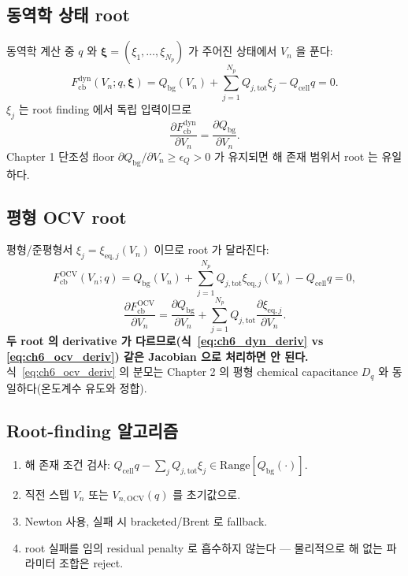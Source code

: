 \documentclass[11pt,a4paper]{article}
\newcommand{\eq}{\mathrm{eq}}
\newcommand{\tot}{\mathrm{tot}}
\newcommand{\bg}{\mathrm{bg}}
\newcommand{\cell}{\mathrm{cell}}
\newcommand{\OCV}{\mathrm{OCV}}
\newcommand{\cb}{\mathrm{cb}}
\newcommand{\dyn}{\mathrm{dyn}}
\begin{document}
\subsection{동역학 상태 root}
동역학 계산 중 $q$ 와 $\bm\xi=(\xi_1,\dots,\xi_{N_p})$ 가 주어진 상태에서 $V_n$ 을 푼다:
\begin{equation}
F_{\cb}^{\dyn}(V_n;q,\bm\xi)=Q_\bg(V_n)+\sum_{j=1}^{N_p}Q_{j,\tot}\xi_j-Q_\cell q=0.
\label{eq:ch6_dyn_root}
\end{equation}
$\xi_j$ 는 root finding 에서 독립 입력이므로
\begin{equation}
\frac{\partial F_{\cb}^{\dyn}}{\partial V_n}=\frac{\partial Q_\bg}{\partial V_n}.
\label{eq:ch6_dyn_deriv}
\end{equation}
Chapter 1 단조성 floor $\partial Q_\bg/\partial V_n\ge\epsilon_Q>0$ 가 유지되면 해 존재 범위서 root 는 유일하다.

\subsection{평형 OCV root}
평형/준평형서 $\xi_j=\xi_{\eq,j}(V_n)$ 이므로 root 가 달라진다:
\begin{equation}
F_{\cb}^{\OCV}(V_n;q)=Q_\bg(V_n)+\sum_{j=1}^{N_p}Q_{j,\tot}\xi_{\eq,j}(V_n)-Q_\cell q=0,
\label{eq:ch6_ocv_root}
\end{equation}
\begin{equation}
\frac{\partial F_{\cb}^{\OCV}}{\partial V_n}=\frac{\partial Q_\bg}{\partial V_n}+\sum_{j=1}^{N_p}Q_{j,\tot}\frac{\partial\xi_{\eq,j}}{\partial V_n}.
\label{eq:ch6_ocv_deriv}
\end{equation}
\textbf{두 root 의 derivative 가 다르므로(식~\eqref{eq:ch6_dyn_deriv} vs \eqref{eq:ch6_ocv_deriv}) 같은
Jacobian 으로 처리하면 안 된다.} 식~\eqref{eq:ch6_ocv_deriv} 의 분모는 Chapter 2 의 평형 chemical
capacitance $D_q$ 와 동일하다(온도계수 유도와 정합).

\subsection{Root-finding 알고리즘}
\begin{enumerate}[label=R\arabic*),leftmargin=2.2em]
\item 해 존재 조건 검사: $Q_\cell q-\sum_jQ_{j,\tot}\xi_j\in\mathrm{Range}[Q_\bg(\cdot)]$.
\item 직전 스텝 $V_n$ 또는 $V_{n,\OCV}(q)$ 를 초기값으로.
\item Newton 사용, 실패 시 bracketed/Brent 로 fallback.
\item root 실패를 임의 residual penalty 로 흡수하지 않는다 — 물리적으로 해 없는 파라미터 조합은 reject.
\end{enumerate}
\end{document}
